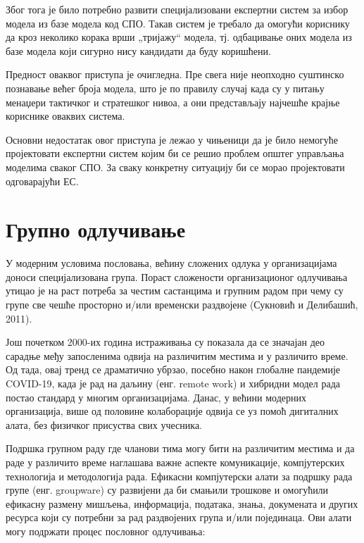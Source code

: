 Због тога је било потребно развити специјализовани експертни систем за избор модела из базе модела код СПО. Такав систем је требало да омогући кориснику да кроз неколико корака врши „тријажу“ модела, тј. одбацивање оних модела из базе модела који сигурно нису кандидати да буду коришћени.

Предност оваквог приступа је очигледна. Пре свега није неопходно суштинско познавање већег броја модела, што је по правилу случај када су у питању менаџери тактичког и стратешког нивоа, а они представљају најчешће крајње кориснике оваквих система.

Основни недостатак овог приступа је лежао у чињеници да је било немогуће пројектовати експертни систем којим би се решио проблем општег управљања моделима сваког СПО. За сваку конкретну ситуацију би се морао пројектовати одговарајући ЕС.

\section{Групно одлучивање}
У модерним условима пословања, већину сложених одлука у организацијама доноси специјализована група. Пораст сложености организационог одлучивања утицао је на раст потреба за честим састанцима и групним радом при чему су групе све чешће просторно и/или временски раздвојене (Сукновић и Делибашић, 2011).

Још почетком 2000-их година истраживања су показала да се значајан део сарадње међу запосленима одвија на различитим местима и у различито време. Од тада, овај тренд се драматично убрзао, посебно након глобалне пандемије COVID-19, када је рад на даљину (енг. remote work) и хибридни модел рада постао стандард у многим организацијама. Данас, у већини модерних организација, више од половине колаборације одвија се уз помоћ дигиталних алата, без физичког присуства свих учесника.

Подршка групном раду где чланови тима могу бити на различитим местима и да раде у различито време наглашава важне аспекте комуникације, компјутерских технологија и методологија рада. Ефикасни компјутерски алати за подршку рада групе (енг. groupware) су развијени да би смањили трошкове и омогућили ефикасну размену мишљења, информација, података, знања, докумената и других ресурса који су потребни за рад раздвојених група и/или појединаца. Ови алати могу подржати процес пословног одлучивања:

